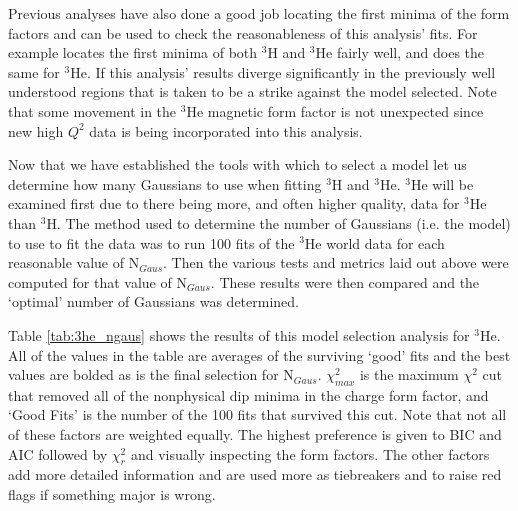 Previous analyses have also done a good job locating the first minima of the form factors and can be used to check the reasonableness of this analysis' fits. For example \cite{Article:Amroun} locates the first minima of both $^3$H and $^3$He fairly well, and \cite{Article:Alex} does the same for $^3$He. If this analysis' results diverge significantly in the previously well understood regions that is taken to be a strike against the model selected. Note that some movement in the $^3$He magnetic form factor is not unexpected since new high $Q^2$ data is being incorporated into this analysis.

Now that we have established the tools with which to select a model let us determine how many Gaussians to use when fitting $^3$H and $^3$He. $^3$He will be examined first due to there being more, and often higher quality, data for $^3$He than $^3$H. The method used to determine the number of Gaussians (i.e. the model) to use to fit the data was to run 100 fits of the $^3$He world data for each reasonable value of N$_{Gaus}$. Then the various tests and metrics laid out above were computed for that value of N$_{Gaus}$. These results were then compared and the `optimal' number of Gaussians was determined.

Table \ref{tab:3he_ngaus} shows the results of this model selection analysis for $^3$He. All of the values in the table are averages of the surviving `good' fits and the best values are bolded as is the final selection for N$_{Gaus}$. $\chi^2_{max}$ is the maximum $\chi^2$ cut that removed all of the nonphysical dip minima in the charge form factor, and `Good Fits' is the number of the 100 fits that survived this cut. Note that not all of these factors are weighted equally. The highest preference is given to BIC and AIC followed by $\chi^2_r$ and visually inspecting the form factors. The other factors add more detailed information and are used more as tiebreakers and to raise red flags if something major is wrong.

